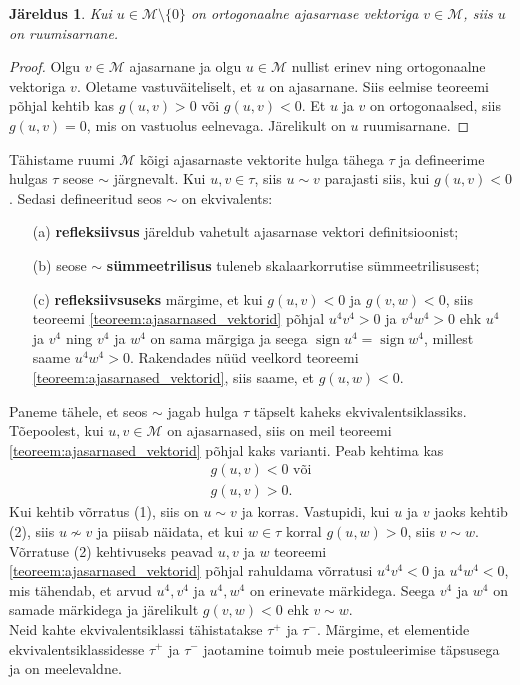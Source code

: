 \documentclass[a4paper,12pt]{article}
\theoremstyle{plain}
\newtheorem{jareldus}{Järeldus}[section]
\theoremstyle{definition}
\numberwithin{equation}{section}
\DeclareMathOperator{\sign}{sign}
\begin{document}
\begin{jareldus}
Kui $u \in \mathcal{M} \setminus \{0\}$ on ortogonaalne ajasarnase vektoriga $v \in \mathcal{M}$, siis $u$ on ruumisarnane.
\end{jareldus}
\begin{proof}
Olgu $v \in \mathcal{M}$ ajasarnane ja olgu $u \in \mathcal{M}$ nullist erinev ning ortogonaalne vektoriga $v$. Oletame vastuväiteliselt, et $u$ on ajasarnane. Siis eelmise teoreemi põhjal kehtib kas $g\left(u,v\right) > 0$ või $g\left(u,v\right) < 0$. Et $u$ ja $v$ on ortogonaalsed, siis $g\left(u,v\right) = 0$, mis on vastuolus eelnevaga. Järelikult on $u$ ruumisarnane.
\end{proof}

Tähistame ruumi $\mathcal{M}$ kõigi ajasarnaste vektorite hulga tähega $\tau$ ja defineerime hulgas $\tau$ seose $\sim$ järgnevalt. Kui $u,v \in \tau$, siis $u \sim v$ parajasti siis, kui $g\left(u,v\right) < 0$. Sedasi defineeritud seos $\sim$ on ekvivalents:
\begin{itemize}
\item[(a)] \textbf{refleksiivsus} järeldub vahetult ajasarnase vektori definitsioonist;
\item[(b)] seose $\sim$ \textbf{sümmeetrilisus} tuleneb skalaarkorrutise sümmeetrilisusest;
\item[(c)] \textbf{refleksiivsuseks} märgime, et kui $g\left(u,v\right) < 0$ ja $g\left(v, w\right) < 0$, siis teoreemi \ref{teoreem:ajasarnased_vektorid} põhjal $u^4 v^4 > 0$ ja $v^4 w^4 > 0$ ehk $u^4$ ja $v^4$ ning $v^4$ ja $w^4$ on sama märgiga ja seega $\sign u^4 = \sign w^4$, millest saame $u^4 w^4 > 0$. Rakendades nüüd veelkord teoreemi \ref{teoreem:ajasarnased_vektorid}, siis saame, et $g\left(u, w\right) < 0$.
\end{itemize}
Paneme tähele, et seos $\sim$ jagab hulga $\tau$ täpselt kaheks ekvivalentsiklassiks. Tõe\-poolest,
kui $u, v \in \mathcal{M}$ on ajasarnased, siis on meil teoreemi \ref{teoreem:ajasarnased_vektorid} põhjal kaks varianti. Peab kehtima kas 
\begin{align}
g\left(u,v\right) < 0 \text{ või} \tag{1} \\
g\left(u,v\right) > 0. \tag{2}
\end{align}
Kui kehtib võrratus (1), siis on $u \sim v$ ja korras. Vastupidi, kui $u$ ja $v$ jaoks kehtib (2), siis $u \nsim v$ ja piisab näidata, et kui $w \in \tau$ korral $g\left(u,w\right) > 0$, siis $v \sim w$. Võrratuse (2) kehtivuseks peavad $u, v$ ja $w$ teoreemi \ref{teoreem:ajasarnased_vektorid} põhjal rahuldama võrratusi $u^4 v^4 < 0$ ja $u^4 w^4 < 0$, mis tähendab, et arvud $u^4, v^4$ ja $u^4, w^4$ on erinevate märkidega. Seega $v^4$ ja $w^4$ on samade märkidega ja järelikult $g\left(v,w\right) < 0$ ehk $v \sim w$. \\
Neid kahte ekvivalentsiklassi tähistatakse $\tau^+$ ja $\tau^-$. Märgime, et elementide ekvivalentsiklassidesse $\tau^+$ ja $\tau^-$ jaotamine toimub meie postuleerimise täpsusega ja on meelevaldne.
\end{document}
